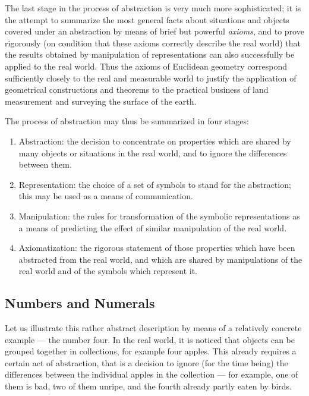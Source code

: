 The last stage in the process of abstraction is very much more sophisticated; it is the attempt to summarize the most general facts about situations and objects covered under an abstraction by means of brief but powerful \textit{axioms}, and to prove rigorously (on condition that these axioms correctly describe the real world) that the results obtained by manipulation of representations can also successfully be applied to the real world. Thus the axioms of Euclidean geometry correspond sufficiently closely to the real and measurable world to justify the application of geometrical constructions and theorems to the practical business of land measurement and surveying the surface of the earth.

The process of abstraction may thus be summarized in four stages:

\begin{enumerate}[leftmargin=2\parindent, label=(\arabic*)]
	\item Abstraction: the decision to concentrate on properties which are shared  by many objects or situations in the real world, and to ignore the differences between them.
	\item Representation: the choice of a set of symbols to stand for the abstraction; this may be used as a means of communication.
	\item Manipulation: the rules for transformation of the symbolic representations as a means of predicting the effect of similar manipulation of the real world.
	\item Axiomatization: the rigorous statement of those properties which have been abstracted from the real world, and which are shared by manipulations of the real world and of the symbols which represent it.
\end{enumerate}

\subsection{Numbers and Numerals}
Let us illustrate this rather abstract description by means of a relatively concrete example --- the number four. In the real world, it is noticed that objects can be grouped together in collections, for example four apples. This already requires a certain act of abstraction, that is a decision to ignore (for the time being) the differences between the individual apples in the collection --- for example, one of them is bad, two of them unripe, and the fourth already partly eaten by birds.

